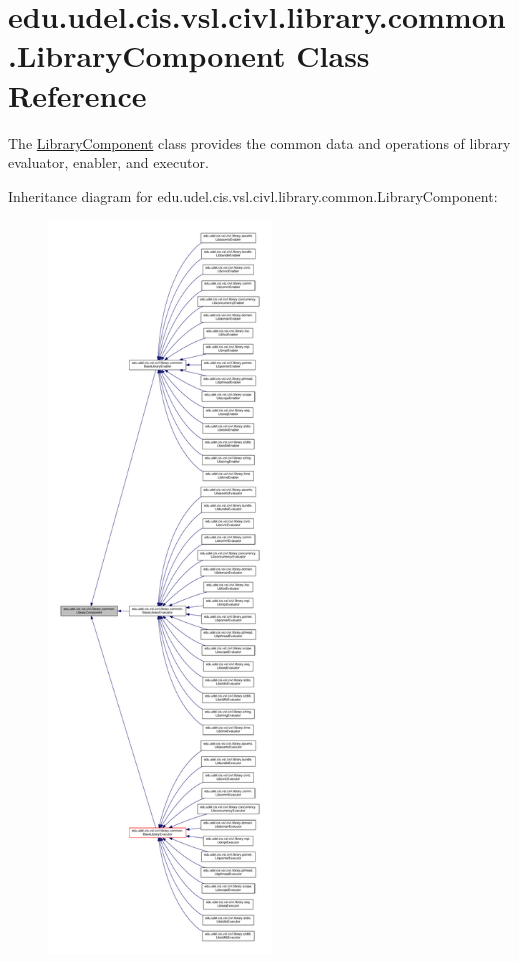 \hypertarget{classedu_1_1udel_1_1cis_1_1vsl_1_1civl_1_1library_1_1common_1_1LibraryComponent}{}\section{edu.\+udel.\+cis.\+vsl.\+civl.\+library.\+common.\+Library\+Component Class Reference}
\label{classedu_1_1udel_1_1cis_1_1vsl_1_1civl_1_1library_1_1common_1_1LibraryComponent}


The \hyperlink{classedu_1_1udel_1_1cis_1_1vsl_1_1civl_1_1library_1_1common_1_1LibraryComponent}{Library\+Component} class provides the common data and operations of library evaluator, enabler, and executor.  




Inheritance diagram for edu.\+udel.\+cis.\+vsl.\+civl.\+library.\+common.\+Library\+Component\+:
\nopagebreak
\begin{figure}[H]
\begin{center}
\leavevmode
\includegraphics[height=550pt]{classedu_1_1udel_1_1cis_1_1vsl_1_1civl_1_1library_1_1common_1_1LibraryComponent__inherit__graph}
\end{center}
\end{figure}


